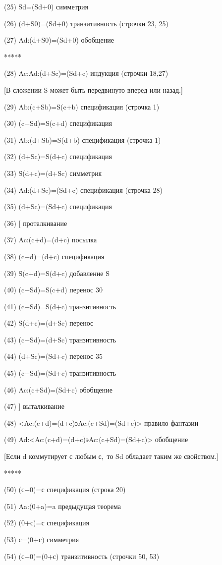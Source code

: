 \documentclass[../main.tex]{subfiles}
\begin{document}
(25) Sd=(Sd+0) симметрия

(26) (d+S0)=(Sd+0) транзитивность (строчки 23, 25)

(27) Ad:(d+S0)=(Sd+0) обобщение

*****

(28) Ac:Ad:(d+Sc)=(Sd+c) индукция (строчки 18,27)

{[}В сложении S может быть передвинуто вперед или назад.{]}

(29) Ab:(c+Sb)=S(c+b) спецификация (строчка 1)

(30) (c+Sd)=S(c+d) спецификация

(31) Ab:(d+Sb)=S(d+b) спецификация (строчка 1)

(32) (d+Sc)=S(d+c) спецификация

(33) S(d+c)=(d+Sc) симметрия

(34) Ad:(d+Sc)=(Sd+c) спецификация (строчка 28)

(35) (d+Sc)=(Sd+c) спецификация

(36) {[} проталкивание

(37) Ac:(c+d)=(d+c) посылка

(38) (c+d)=(d+c) спецификация

(39) S(c+d)=S(d+c) добавление S

(40) (c+Sd)=S(c+d) перенос 30

(41) (c+Sd)=S(d+c) транзитивность

(42) S(d+c)=(d+Sc) перенос

(43) (c+Sd)=(d+Sc) транзитивность

(44) (d+Sc)=(Sd+c) перенос 35

(45) (c+Sd)=(Sd+c) транзитивность

(46) Ac:(c+Sd)=(Sd+c) обобщение

(47) {]} выталкивание

(48) \textless Ac:(c+d)=(d+c)эAc:(c+Sd)=(Sd+c)\textgreater{} правило фантазии

(49) Ad:\textless Ac:(c+d)=(d+c)эAc:(c+Sd)=(Sd+c)\textgreater{} обобщение

{[}Если d коммутирует с любым с,~то Sd обладает таким же свойством.{]}

*****

(50) (с+0)=с спецификация (строка 20)

(51) Aa:(0+a)=a предыдущая теорема

(52) (0+с)=с спецификация

(53) с=(0+с) симметрия

(54) (с+0)=(0+с) транзитивность (строчки 50, 53)
\end{document}
